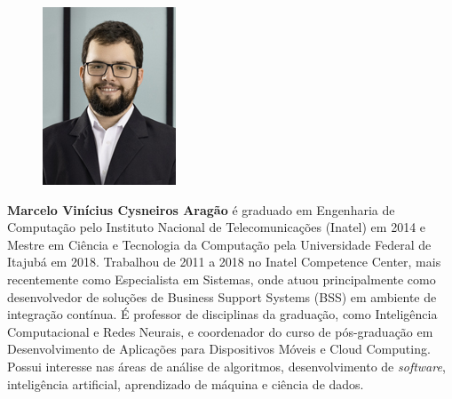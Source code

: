 \begin{figure}
\includegraphics[width=\linewidth]{figuras/autor_marcelo.jpg}  
\end{figure}

\textbf{Marcelo Vinícius Cysneiros Aragão} é graduado em Engenharia de Computação pelo Instituto Nacional de Telecomunicações (Inatel) em 2014 e Mestre em Ciência e Tecnologia da Computação pela Universidade Federal de Itajubá em 2018. Trabalhou de 2011 a 2018 no Inatel Competence Center, mais recentemente como Especialista em Sistemas, onde atuou principalmente como desenvolvedor de soluções de Business Support Systems (BSS) em ambiente de integração contínua. É professor de disciplinas da graduação, como Inteligência Computacional e Redes Neurais, e coordenador do curso de pós-graduação em Desenvolvimento de Aplicações para Dispositivos Móveis e Cloud Computing. Possui interesse nas áreas de análise de algoritmos, desenvolvimento de \textit{software}, inteligência artificial, aprendizado de máquina e ciência de dados.
